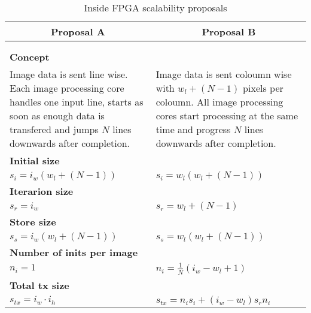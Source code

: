 \begin{table}[tb!]
    \centering
    \begin{tabular}{p{} p{}}
        \toprule
        \multicolumn{1}{c}{Proposal A} & \multicolumn{1}{c}{Proposal B} \\
        \midrule
            \begin{adjustbox}{max width=0.4\textwidth}
                
            \end{adjustbox}
        & 
            \begin{adjustbox}{max width=0.4\textwidth}
                
            \end{adjustbox}
        \\
        \multicolumn{2}{c}{
            \begin{adjustbox}{max width=0.8\textwidth}
                
            \end{adjustbox}
        }
        \\\midrule
        \textbf{Concept} & \\
        Image data is sent line wise. Each image processing core handles one
        input line, starts as soon as enough data is transfered and jumps $N$ lines
        downwards after completion.
        &
        Image data is sent coloumn wise with $w_l+(N-1)$ pixels per coloumn. All
        image processing cores start processing at the same time and progress
        $N$ lines downwards after completion.
        \\\midrule
        \textbf{Initial size} & \\
        {\( 
            s_i = i_w(w_l+(N-1))
        \)}
        &
        {\( 
            s_i = w_l(w_l+(N-1))
        \)}
        \\\midrule
        \textbf{Iterarion size} & \\
        {\( 
            s_r  = i_w
        \)}
        &
        {\( 
            s_r  = w_l+(N-1)
        \)}
        \\\midrule
        \textbf{Store size} & \\
        {\( 
            s_s  = i_w(w_l+(N-1))
        \)}
        &
        {\( 
            s_s  = w_l(w_l+(N-1))
        \)}
        \\\midrule
        \textbf{Number of inits per image} & \\
        {\( 
            n_i  = 1
        \)}
        &
        {\( 
            n_i  = \frac{1}{N}(i_w-w_l+1)
        \)}
        \\\midrule
        \textbf{Total tx size} & \\
        {\( 
            s_{tx}  = i_w \cdot i_h
        \)}
        &
        {\( 
            s_{tx}  = n_i s_i + (i_w-w_l)s_r n_i
        \)}
        \\
        \bottomrule
    \end{tabular}
    \caption{Inside FPGA scalability proposals}
    \label{tab:insidefpgascalability}
\end{table}

